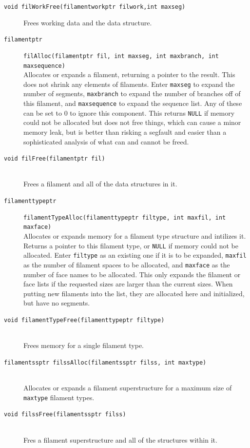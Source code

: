 \documentclass {scrbook}
\newcommand {\ttt} {\texttt}
\begin{document}
\begin{description}
\item[\ttt{void filWorkFree(filamentworkptr filwork,int maxseg)}]
Frees working data and the data structure.

\item[\ttt{filamentptr}]
\ttt{filAlloc(filamentptr fil, int maxseg, int maxbranch, int maxsequence)}
\hfill \\
Allocates or expands a filament, returning a pointer to the result. This does not shrink any elements of filaments. Enter \ttt{maxseg} to expand the number of segments, \ttt{maxbranch} to expand the number of branches off of this filament, and \ttt{maxsequence} to expand the sequence list. Any of these can be set to 0 to ignore this component. This returns \ttt{NULL} if memory could not be allocated but does not free things, which can cause a minor memory leak, but is better than risking a segfault and easier than a sophisticated analysis of what can and cannot be freed.

\item[\ttt{void filFree(filamentptr fil)}]
\hfill \\
Frees a filament and all of the data structures in it.

\item[\ttt{filamenttypeptr}]
\ttt{filamentTypeAlloc(filamenttypeptr filtype, int maxfil, int maxface)}
\hfill \\
Allocates or expands memory for a filament type structure and intilizes it. Returns a pointer to this filament type, or \ttt{NULL} if memory could not be allocated. Enter \ttt{filtype} as an existing one if it is to be expanded, \ttt{maxfil} as the number of filament spaces to be allocated, and \ttt{maxface} as the number of face names to be allocated. This only expands the filament or face lists if the requested sizes are larger than the current sizes. When putting new filaments into the list, they are allocated here and initialized, but have no segments.

\item[\ttt{void filamentTypeFree(filamenttypeptr filtype)}]
\hfill \\
Frees memory for a single filament type.

\item[\ttt{filamentssptr filssAlloc(filamentssptr filss, int maxtype)}]
\hfill \\
Allocates or expands a filament superstructure for a maximum size of \ttt{maxtype} filament types.

\item[\ttt{void filssFree(filamentssptr filss)}]
\hfill \\
Fres a filament superstructure and all of the structures within it.



\end{description}
\end{document}
